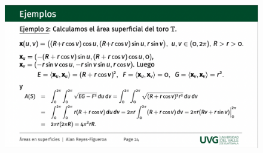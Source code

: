 \begin{problema}
\begin{itemize}
\begin{dem}
            \begin{figure}[H]
                \centering
                \includegraphics[scale=0.3]{imagenes/3.png}
            \end{figure}
        \end{dem}
    \end{itemize}

\end{problema}

